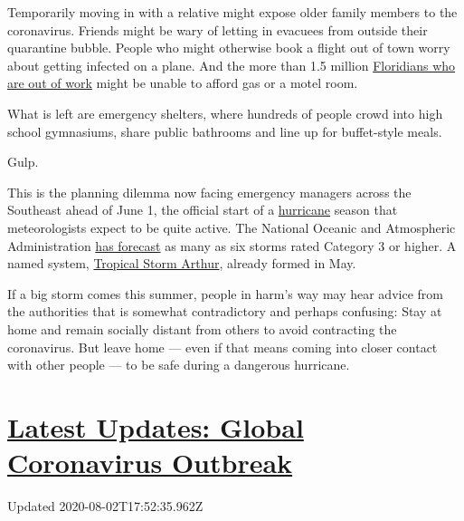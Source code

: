 Temporarily moving in with a relative might expose older family members
to the coronavirus. Friends might be wary of letting in evacuees from
outside their quarantine bubble. People who might otherwise book a
flight out of town worry about getting infected on a plane. And the more
than 1.5 million
\href{https://www.nytimes.com/2020/04/23/us/florida-coronavirus-unemployment.html}{Floridians
who are out of work} might be unable to afford gas or a motel room.

What is left are emergency shelters, where hundreds of people crowd into
high school gymnasiums, share public bathrooms and line up for
buffet-style meals.

Gulp.

This is the planning dilemma now facing emergency managers across the
Southeast ahead of June 1, the official start of a
\href{https://www.nytimes.com/interactive/2020/07/25/us/hurricane-hanna-tracker-map.html}{hurricane}
season that meteorologists expect to be quite active. The National
Oceanic and Atmospheric Administration
\href{https://www.nytimes.com/2020/05/21/climate/hurricane-season-2020-noaa.html}{has
forecast} as many as six storms rated Category 3 or higher. A named
system,
\href{https://www.nytimes.com/2020/05/17/us/tropical-storm-arthur-2020-path.html}{Tropical
Storm Arthur}, already formed in May.

If a big storm comes this summer, people in harm's way may hear advice
from the authorities that is somewhat contradictory and perhaps
confusing: Stay at home and remain socially distant from others to avoid
contracting the coronavirus. But leave home --- even if that means
coming into closer contact with other people --- to be safe during a
dangerous hurricane.

\hypertarget{latest-updates-global-coronavirus-outbreak}{%
\section{\texorpdfstring{\href{https://www.nytimes.com/2020/08/01/world/coronavirus-covid-19.html?action=click\&pgtype=Article\&state=default\&region=MAIN_CONTENT_1\&context=storylines_live_updates}{Latest
Updates: Global Coronavirus
Outbreak}}{Latest Updates: Global Coronavirus Outbreak}}\label{latest-updates-global-coronavirus-outbreak}}

Updated 2020-08-02T17:52:35.962Z

